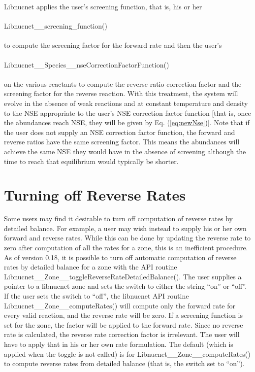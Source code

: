 \documentclass{article}    %
\begin{document}
Libnucnet applies the user's screening function, that is, his or her\\
\\
Libnucnet\_\_screening\_function()\\
\\
to compute the screening
factor for the forward rate and then the user's\\
\\
Libnucnet\_\_Species\_\_nseCorrectionFactorFunction()\\
\\
on the various reactants to compute the reverse ratio correction factor
and the screening factor for the
reverse reaction.  With this treatment, the system will evolve in the
absence of weak reactions and at constant temperature and
density to the NSE appropriate
to the user's NSE correction factor function [that is, once the abundances
reach NSE, they will be given by Eq. (\ref{eq:newNse})].  Note that if the
user does not supply an NSE correction factor function, the forward and
reverse ratios have the same screening factor.
This means the abundances will achieve the same NSE they would have in the
absence of screening although the time to reach that equilibrium would
typically be shorter.

\section{Turning off Reverse Rates}

Some users may find it desirable to turn off computation of reverse rates
by detailed balance.  For example, a user may wish instead to supply his or
her own forward and reverse rates.  While this can be done by updating the
reverse rate to zero after computation of all the rates for a zone, this
is an inefficient procedure.  As of version 0.18, it is possible to turn
off automatic computation of reverse rates by detailed balance for a zone
with the API routine Libnucnet\_\_Zone\_\_toggleReverseRateDetailedBalance().
The user supplies a pointer to a libnucnet zone and sets the switch to
either the string ``on'' or ``off''.  If the user sets the switch to ``off'',
the libnucnet API routine Libnucnet\_\_Zone\_\_computeRates()
will compute only the forward rate for every valid reaction, and
the reverse rate will be zero.  If a screening function is set for the
zone, the factor will be applied to the forward rate.  Since no reverse
rate is calculated, the reverse rate correction factor is irrelevant.  The
user will have to apply that in his or her own rate formulation.
The default (which is applied when the toggle is not called) is for 
Libnucnet\_\_Zone\_\_computeRates() to compute reverse rates from detailed
balance (that is, the switch set to ``on'').
\end{document}
